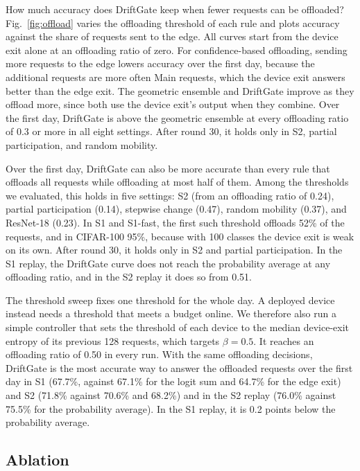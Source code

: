 How much accuracy does DriftGate keep when fewer requests can be offloaded? Fig.~\ref{fig:offload} varies the offloading threshold of each rule and plots accuracy against the share of requests sent to the edge. All curves start from the device exit alone at an offloading ratio of zero. For confidence-based offloading, sending more requests to the edge lowers accuracy over the first day, because the additional requests are more often Main requests, which the device exit answers better than the edge exit. The geometric ensemble and DriftGate improve as they offload more, since both use the device exit's output when they combine. Over the first day, DriftGate is above the geometric ensemble at every offloading ratio of 0.3 or more in all eight settings. After round 30, it holds only in S2, partial participation, and random mobility.

Over the first day, DriftGate can also be more accurate than every rule that offloads all requests while offloading at most half of them. Among the thresholds we evaluated, this holds in five settings: S2 (from an offloading ratio of 0.24), partial participation (0.14), stepwise change (0.47), random mobility (0.37), and ResNet-18 (0.23). In S1 and S1-fast, the first such threshold offloads 52\% of the requests, and in CIFAR-100 95\%, because with 100 classes the device exit is weak on its own. After round 30, it holds only in S2 and partial participation. In the S1 replay, the DriftGate curve does not reach the probability average at any offloading ratio, and in the S2 replay it does so from 0.51.

The threshold sweep fixes one threshold for the whole day. A deployed device instead needs a threshold that meets a budget online. We therefore also run a simple controller that sets the threshold of each device to the median device-exit entropy of its previous 128 requests, which targets $\beta=0.5$. It reaches an offloading ratio of 0.50 in every run. With the same offloading decisions, DriftGate is the most accurate way to answer the offloaded requests over the first day in S1 (67.7\%, against 67.1\% for the logit sum and 64.7\% for the edge exit) and S2 (71.8\% against 70.6\% and 68.2\%) and in the S2 replay (76.0\% against 75.5\% for the probability average). In the S1 replay, it is 0.2 points below the probability average.

\subsection{Ablation}
\label{sec:ablation}

